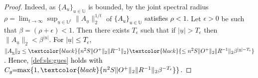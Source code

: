 \documentclass[journal,twoside,web]{ieeecolor}
\begin{document}
\begin{proof}
  Indeed, as $\{ A_u\}_{u \in \mathbb{U}}$ is bounded, by
  \cite[Corollary 1.1]{RJungers} 
  the joint spectral radius
  $\rho=\lim_{t \rightarrow \infty}\sup_{\underline{u} \in \mathbb{U}^t} \|A_{\underline{u}}\|_2^{1/t}$ of   \textcolor{black}{$\{A_u\}_{u \in \mathbb{U}}$ satisfies $\rho \!\!<\!\! 1$.}
  Let $\epsilon > 0$ be such that $\beta=(\rho+\epsilon)<1$.
  Then there exists $T_{\epsilon}$ such that if $|\underline{u}| > T_{\epsilon}$
  then $\|A_{\underline{u}}\|_2 < \beta^{|\underline{u}|}$.
  \textcolor{black}{For \textcolor{black}{$|\underline{u}| \le T_{\epsilon}$},
  $\|A_{\underline{u}}\|_2 \le \textcolor{black}{n^2S\|O^{+}\|_2 \|R^{-1}\|_2} \textcolor{black}{\le n^2S\|O^{+}\|_2 \|R^{-1}\|_2 \beta^{|\underline{u}|-T_{\epsilon}}}$.
  Hence, 
  \eqref{def:sls:gues} holds with 
  $C_g\!\!=\!\!\max\{1, \textcolor{black}{n^2S\|O^{+}\|_2 \|R^{-1}\|_2 \beta^{-T_{\epsilon}}}\}$.}

\end{proof}
\end{document}
